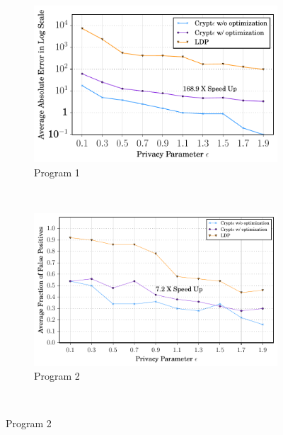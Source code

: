  
\begin{figure}[ht]

    \begin{subfigure}[b]{0.25\linewidth}
        \centering
         \includegraphics[width=1\linewidth]{t1.pdf}
        \caption{ Program 1}
        \label{fig:gull}
    \end{subfigure}%
    ~ %
    \begin{subfigure}[b]{0.25\linewidth}
       \centering %
       \includegraphics[width=1\linewidth]{t22.pdf}
        \caption{ Program 2}
        \label{fig:tiger}
    \end{subfigure}%
    ~ %

\end{figure}
